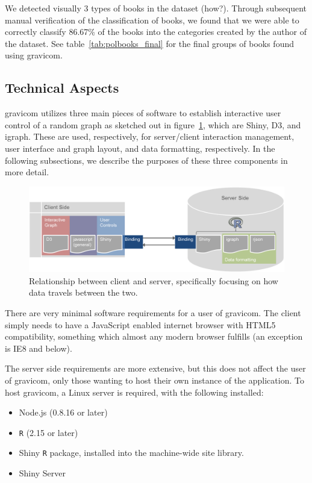 \documentclass{article}\usepackage[]{graphicx}\usepackage[]{color}
\newcommand{\ak}[1]{{\color{blue} #1}}
\begin{document}
We detected visually 3 types of books in the dataset \ak{(how?)}. Through subsequent manual verification of the classification of books, we found that we were able to correctly classify 86.67\% of the books into the categories created by the author of the dataset. See table~\ref{tab:polbooks_final} for the final groups of books found using gravicom.


\subsection{Technical Aspects}

gravicom utilizes three main pieces of software to establish interactive user control of a random graph as sketched out in figure~\ref{fig:clientserver}, which are Shiny, D3, and igraph. These are used, respectively, for server/client interaction management, user interface and graph layout, and data formatting, respectively. In the following subsections, we describe the purposes of these three components in more detail.

\begin{figure}[H]
\centering
\includegraphics[width=\textwidth]{images/clientserverflow.png}
\caption{\label{fig:clientserver} Relationship between client and server, specifically focusing on how data travels between the two.}
\end{figure}

There are very minimal software requirements for a user of gravicom. The client simply needs to have a JavaScript enabled internet browser with HTML5 compatibility, something which almost any modern browser fulfills (an exception is IE8 and below). 

The server side requirements are more extensive, but this does not affect the user of gravicom, only those wanting to host their own instance of the application. To host gravicom, a Linux server is required, with the following installed:

\begin{itemize}
\item Node.js (0.8.16 or later)
\item {\tt R} (2.15 or later)
\item Shiny {\tt R} package, installed into the machine-wide site library. 
\item Shiny Server
\end{itemize}
\end{document}
